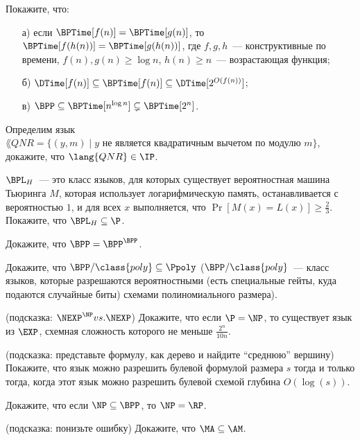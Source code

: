 
\begin{task}
    Покажите, что:
	\begin{enumerate}[topsep = 0pt, itemsep = -1ex]
        \item [а)] если $\BPTime[f(n)] = \BPTime[g(n)]$, то $\BPTime[f(h(n))] = \BPTime[g(h(n))]$, где $f, g, h$~---
			конструктивные по времени, $f(n), g(n) \ge \log n$, $h(n) \ge n$~--- возрастающая функция;
        \item [б)] $\DTime[f(n)] \subseteq \BPTime[f(n)] \subseteq \DTime[2^{O(f(n))}]$;
        \item [в)] $\BPP \subseteq \BPTime[n^{\log n}] \subsetneq \BPTime[2^n]$.
    \end{enumerate}    
\end{task}


\begin{task}
    Определим язык $\lang{QNR} = \{(y, m) \mid \text{$y$ не является квадратичным вычетом по модулю $m$}\}$, докажите, что
    $\lang{QNR} \in \IP$.
\end{task}

\begin{task}
    $\BPL_H$~--- это класс языков, для которых существует вероятностная машина Тьюринга $M$, которая использует логарифмическую
    память, останавливается с вероятностью $1$, и для всех $x$ выполняется, что $\Pr[M(x) = L(x)] \ge \frac{2}{3}$. Покажите, что
    $\BPL_H \subseteq \P$.
\end{task}

\begin{task}
    Докажите, что $\BPP = \BPP^{\BPP}$.
\end{task}

\begin{task}
    Докажите, что $\BPP/\class{poly} \subseteq \Ppoly$ ($\BPP/\class{poly}$~--- класс языков, которые разрешаются вероятностными
    (есть специальные гейты, куда подаются случайные биты) схемами полиномиального размера).
\end{task}





\breakline

\begin{ptask}{26}(подсказка: $\NEXP^{\NP} vs. \NEXP$)
    Докажите, что если $\P = \NP$, то существует язык из $\EXP$, схемная сложность которого не меньше $\frac{2^n}{10 n}$.
\end{ptask}

\begin{ptask}{37} (подсказка: представьте формулу, как дерево и найдите ``среднюю'' вершину)
    Покажите, что язык можно разрешить булевой формулой размера $s$ тогда и только тогда, когда этот язык можно разрешить булевой
    схемой глубина $O(\log(s))$.
\end{ptask}

\begin{ptask}{40}
    Докажите, что если $\NP \subseteq \BPP$, то $\NP = \RP$.
\end{ptask}

\begin{ptask}{43}(подсказка: понизьте ошибку)
	Докажите, что $\MA \subseteq \AM$.
\end{ptask}
